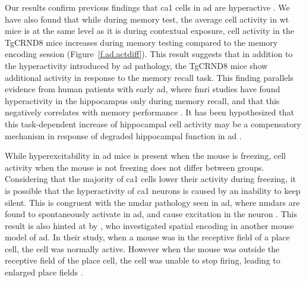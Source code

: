 Our results confirm previous findings that \gls{ca1} cells in \gls{ad} are hyperactive \citep{palop16}. We have also found that while during memory test, the average cell activity in \gls{wt} mice is at the same level as it is during contextual exposure, cell activity in the TgCRND8 mice increases during memory testing compared to the memory encoding session (Figure~\ref{f.ad.actdiff}). This result suggests that in addition to the hyperactivity introduced by \gls{ad} pathology, the TgCRND8 mice show additional activity in response to the memory recall task. This finding parallels evidence from human patients with early \gls{ad}, where \gls{fmri} studies have found hyperactivity in the hippocampus only during memory recall, and that this negatively correlates with memory performance \citep{sperling09, reiman12, kunz15}. It has been hypothesized that this task-dependent increase of hippocampal cell activity may be a compensatory mechanism in response of degraded hippocampal function in \gls{ad} \citep{kunz15}.

While hyperexcitability in \gls{ad} mice is present when the mouse is freezing, cell activity when the mouse is not freezing does not differ between groups. Considering that the majority of \gls{ca1} cells lower their activity during freezing, it is possible that the hyperactivity of \gls{ca1} neurons is caused by an inability to keep silent. This is congruent with the \gls{nmdar} pathology seen in \gls{ad}, where \glspl{nmdar} are found to spontaneously activate in \gls{ad}, and cause excitation in the neuron \citep{danysz12}. This result is also hinted at by \citet{cheng13}, who investigated spatial encoding in another mouse model of \gls{ad}. In their study, when a mouse was in the receptive field of a place cell, the cell was normally active. However when the mouse was outside the receptive field of the place cell, the cell was unable to stop firing, leading to enlarged place fields \citep{cheng13}. 

